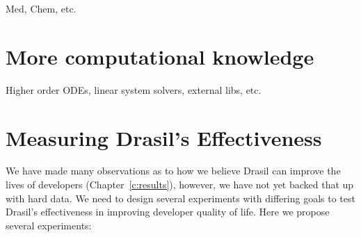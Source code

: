Med, Chem, etc.

\section{More computational knowledge}

Higher order ODEs, linear system solvers, external libs, etc.


\section{Measuring Drasil's Effectiveness}

We have made many observations as to how we believe Drasil can improve the 
lives of developers (Chapter~\ref{c:results}), however, we have not yet backed 
that up with hard data. We need to design several experiments with differing 
goals to test Drasil's effectiveness in improving developer quality of life. 
Here we propose several experiments:

